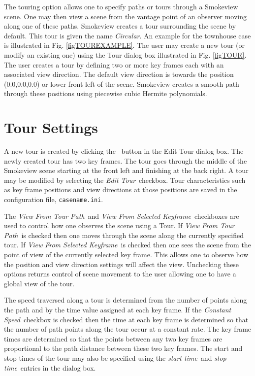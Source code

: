 \documentclass[11pt,twoside]{book}
\newcommand{\frameit}[1]{\fbox{\tt #1}}
\begin{document}
The touring option allows one to specify paths or tours through a
Smokeview scene.  One may then view a scene from the vantage point of an
observer moving along one of these paths. Smokeview creates a tour surrounding
the scene by default.  This tour is given the name {\em Circular}.
An example for the townhouse case is illustrated
in Fig. \ref{figTOUREXAMPLE}.
The user may create a new tour (or modify an existing one) using the Tour
dialog box illustrated in Fig. \ref{figTOUR}. The user creates a tour by
defining two or more key frames each with an associated view direction.
The default view direction is towards the position (0.0,0.0,0.0) or lower front left of the scene.
Smokeview creates a smooth
path through these positions using piecewise cubic Hermite polynomials.

\section{Tour Settings}
A new tour is created
by clicking the \frameit{New Tour}\ button in the Edit Tour dialog box.
The newly created tour has two key frames.  The tour
goes through the middle of the Smokeview scene starting at the
front left and finishing at the back right.
A tour may be modified by selecting the {\em Edit Tour}\ checkbox.
Tour characteristics such as key frame positions and view directions at those positions
are saved in the configuration file, {\tt casename.ini}.

The {\em View From Tour Path}\ and  {\em
View From Selected Keyframe}\ checkboxes are used to control how one observes the
scene using a Tour.  If {\em View From Tour Path}\ is checked then one moves through the
scene along the currently specified tour.  If {\em
View From Selected Keyframe}\ is checked then one sees the scene from the point of view of the
currently selected key frame.  This allows one to observe how
the position and view direction settings will affect the view.  Unchecking these options
returns control of scene movement to the user allowing one to have a global view of the tour.

The speed traversed along a tour is determined from the number of points along the path
and by the time value
assigned at each key frame.   If the {\em Constant Speed}\ checkbox
is checked then the time at each key frame is determined so that
the number of path points along the tour occur at a constant rate.
The key frame times are determined so that the
points between any two key frames are proportional to the path
distance between these two key frames.
The start and stop times of the tour may also be specified using the {\em start time}\ and
{\em stop time}\ entries in the dialog box.
\end{document}
